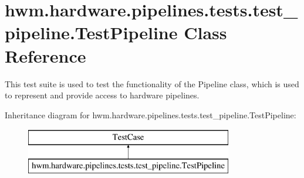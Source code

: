 \hypertarget{classhwm_1_1hardware_1_1pipelines_1_1tests_1_1test__pipeline_1_1_test_pipeline}{\section{hwm.\-hardware.\-pipelines.\-tests.\-test\-\_\-pipeline.\-Test\-Pipeline Class Reference}
\label{classhwm_1_1hardware_1_1pipelines_1_1tests_1_1test__pipeline_1_1_test_pipeline}
}


This test suite is used to test the functionality of the Pipeline class, which is used to represent and provide access to hardware pipelines.  


Inheritance diagram for hwm.\-hardware.\-pipelines.\-tests.\-test\-\_\-pipeline.\-Test\-Pipeline\-:\begin{figure}[H]
\begin{center}
\leavevmode
\includegraphics[height=2.000000cm]{classhwm_1_1hardware_1_1pipelines_1_1tests_1_1test__pipeline_1_1_test_pipeline}
\end{center}
\end{figure}
